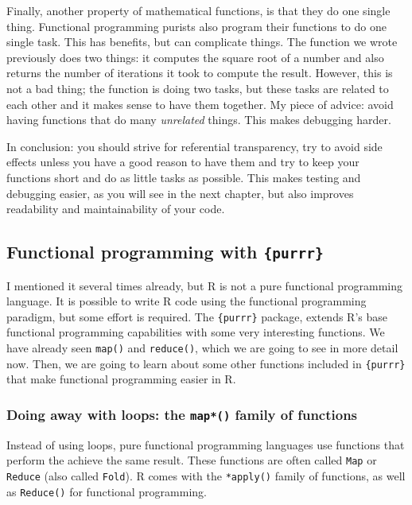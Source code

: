 \documentclass[]{gitbook}
\begin{document}
Finally, another property of mathematical functions, is that they do one single thing. Functional
programming purists also program their functions to do one single task. This has benefits, but
can complicate things. The function we wrote previously does two things: it computes the square
root of a number and also returns the number of iterations it took to compute the result. However,
this is not a bad thing; the function is doing two tasks, but these tasks are related to each other
and it makes sense to have them together. My piece of advice: avoid having functions that do
many \emph{unrelated} things. This makes debugging harder.

In conclusion: you should strive for referential transparency, try to avoid side effects unless you
have a good reason to have them and try to keep your functions short and do as little tasks as
possible. This makes testing and debugging easier, as you will see in the next chapter, but also
improves readability and maintainability of your code.

\hypertarget{functional-programming-with-purrr}{%
\subsection{\texorpdfstring{Functional programming with \texttt{\{purrr\}}}{Functional programming with \{purrr\}}}\label{functional-programming-with-purrr}}

I mentioned it several times already, but R is not a pure functional programming language. It is
possible to write R code using the functional programming paradigm, but some effort is required.
The \texttt{\{purrr\}} package, extends R's base functional programming capabilities with some very interesting
functions. We have already seen \texttt{map()} and \texttt{reduce()}, which we are going to see in more detail now.
Then, we are going to learn about some other functions included in \texttt{\{purrr\}} that make functional
programming easier in R.

\hypertarget{doing-away-with-loops-the-map-family-of-functions}{%
\subsubsection{\texorpdfstring{Doing away with loops: the \texttt{map*()} family of functions}{Doing away with loops: the map*() family of functions}}\label{doing-away-with-loops-the-map-family-of-functions}}

Instead of using loops, pure functional programming languages use functions that perform the achieve
the same result. These functions are often called \texttt{Map} or \texttt{Reduce} (also called \texttt{Fold}). R comes
with the \texttt{*apply()} family of functions, as well as \texttt{Reduce()} for functional programming.
\end{document}
